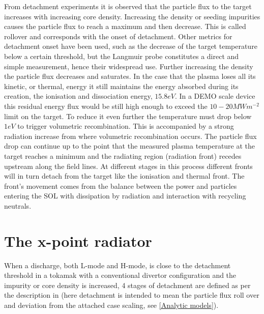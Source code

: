 From detachment experiments it is observed that the particle flux to the target increases with increasing core density. Increasing the density or seeding impurities causes the particle flux to reach a maximum and then decrease. This is called rollover and corresponds with the onset of detachment. Other metrics for detachment onset have been used, such as the decrease of the target temperature below a certain threshold\cite{Stangeby2000,Goldston2017}, but the Langmuir probe constitutes a direct and simple measurement, hence their widespread use. Further increasing the density the particle flux decreases and saturates. In the case that the plasma loses all its kinetic, or thermal, energy it still maintains the energy absorbed during its creation, the ionisation and dissociation energy, $15.8eV$. In a DEMO scale device this residual energy flux would be still high enough to exceed the $10-20 MWm^{-2}$ limit on the target. \cite{Krasheninnikov2017a} To reduce it even further the temperature must drop below $1eV$ to trigger volumetric recombination. This is accompanied by a strong radiation increase from where volumetric recombination occurs. The particle flux drop can continue up to the point that the measured plasma temperature at the target reaches a minimum and the radiating region (radiation front) recedes upstream along the field lines.\cite{Krasheninnikov1999} At different stages in this process different fronts will in turn detach from the target like the ionisation and thermal front.\cite{Hutchinson1994,Loarte1998,Lipschultz2016} The front's movement comes from the balance between the power and particles entering the SOL with dissipation by radiation and interaction with recycling neutrals.




\section{The x-point radiator}\label{The x-point radiator}

When a discharge, both L-mode and H-mode, is close to the detachment threshold in a tokamak with a conventional divertor configuration and the impurity or core density is increased, 4 stages of detachment are defined as per the description in \cite{Reimold2015,Potzel2014} (here detachment is intended to mean the particle flux roll over and deviation from the attached case scaling, see \autoref{Analytic models}).

